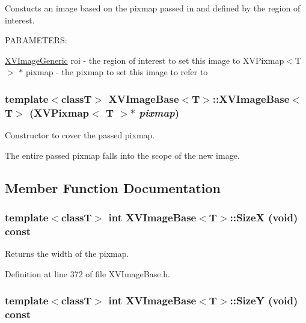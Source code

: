 Constucts an image based on the pixmap passed in and defined by the region of interest.

PARAMETERS:

\hyperlink{class_XVImageGeneric}{XVImage\-Generic} roi - the region of interest to set this image to XVPixmap$<$T$>$ $\ast$ pixmap - the pixmap to set this image to refer to \label{XVImageBase_a22}
\hypertarget{class_XVImageBase_a22}{
\subsubsection[XVImageBase]{\setlength{\rightskip}{0pt plus 5cm}template$<$classT$>$ XVImage\-Base$<$T$>$::XVImage\-Base$<$T$>$ (XVPixmap$<$ T $>$$\ast$ {\em pixmap})}}


Constructor to cover the passed pixmap.

The entire passed pixmap falls into the scope of the new image. 

\subsection{Member Function Documentation}
\label{XVImageBase_a0}
\hypertarget{class_XVImageBase_a0}{
\subsubsection[SizeX]{\setlength{\rightskip}{0pt plus 5cm}template$<$classT$>$ int XVImage\-Base$<$T$>$::Size\-X (void) const}}


Returns the width of the pixmap.



Definition at line 372 of file XVImage\-Base.h.\label{XVImageBase_a1}
\hypertarget{class_XVImageBase_a1}{
\subsubsection[SizeY]{\setlength{\rightskip}{0pt plus 5cm}template$<$classT$>$ int XVImage\-Base$<$T$>$::Size\-Y (void) const}}


